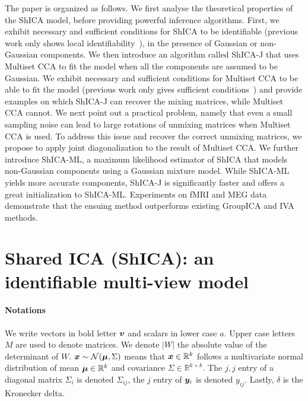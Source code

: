 The paper is organized as follows.
We first analyse the theoretical properties of the ShICA model, before providing powerful inference algorithms.
First, we exhibit necessary and sufficient conditions for ShICA to be identifiable (previous work only shows local identifiability~\cite{anderson2014independent}), in the presence of Gaussian or non-Gaussian components. 
%
We then introduce an algorithm called ShICA-J that uses Multiset CCA to fit the model when all the components are assumed to be Gaussian. We exhibit necessary and sufficient conditions for Multiset CCA to be able to fit the model (previous work only gives sufficient conditions~\cite{li2009joint}) and provide examples on which ShICA-J can recover the mixing matrices, while Multiset CCA cannot. 
%
We next point out a practical problem, namely that even a small sampling noise can lead to large rotations of unmixing matrices when Multiset CCA is used. To address this issue and recover the correct unmixing matrices, we propose to apply joint diagonalization to the result of Multiset CCA.
%
We further introduce ShICA-ML, a maximum likelihood estimator of ShICA that models non-Gaussian components using a Gaussian mixture model. 
%
While ShICA-ML yields more accurate components, ShICA-J is significantly faster and offers a great initialization to ShICA-ML.
Experiments on fMRI and MEG data demonstrate that the ensuing method outperforms existing GroupICA and IVA methods.


\section{Shared ICA (ShICA): an identifiable multi-view model}
\paragraph{Notations} We write vectors in bold letter $\boldsymbol{v}$ and scalars in lower case $a$. Upper case letters $M$ are used to denote
matrices. We denote $|W|$ the absolute value of the determinant of $W$. $\boldsymbol{x} \sim \mathcal{N}(\boldsymbol{\mu}, \Sigma)$ means that $\boldsymbol{x} \in \mathbb{R}^k$ follows
a multivariate normal distribution of mean $\boldsymbol{\mu} \in \mathbb{R}^k$ and
covariance $\Sigma \in \mathbb{R}^{k \times k}$. The $j, j$ entry of a diagonal matrix $\Sigma_i$ is denoted $\Sigma_{ij}$, the $j$ entry of $\boldsymbol{y}_i$ is denoted $y_{ij}$. Lastly, $\delta$ is the Kronecker delta.

